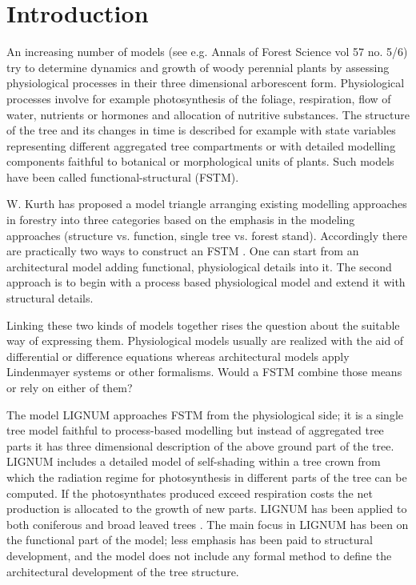 \section{Introduction}
An increasing number of models  (see e.g. Annals of Forest Science vol
57 no.  5/6) try to determine  dynamics and growth  of woody perennial
plants by assessing physiological processes in their three dimensional
arborescent  form.    Physiological  processes  involve   for  example
photosynthesis of  the foliage, respiration, flow  of water, nutrients
or hormones and allocation  of nutritive substances.  The structure of
the tree and  its changes in time is described  for example with state
variables representing different  aggregated tree compartments or with
detailed modelling  components faithful to  botanical or morphological
units of  plants. Such  models have been  called functional-structural
(FSTM).

W.  Kurth has  proposed a  model triangle  \citep{kurth:94b} arranging
existing modelling approaches in  forestry into three categories based
on the  emphasis in the modeling approaches  (structure vs.  function,
single tree vs. forest  stand).  Accordingly there are practically two
ways to construct an FSTM  \citep{sievanen:00}.  One can start from an
architectural  model   \citep{jaeger:92,kurth:94}  adding  functional,
physiological details into it.  The second approach is to begin with a
process  based  physiological  model  \citep{makela:86,  landsberg:86,
sievanen:93} and extend it with structural details.

Linking these  two kinds of  models together rises the  question about
the suitable way of  expressing them. Physiological models usually are
realized with the aid of differential or difference equations
\citep{landsberg:86} whereas architectural models apply Lindenmayer
systems \citep{kurth:99,pp:90} or other formalisms. Would a FSTM
combine those means or rely on either of them?

The model LIGNUM  approaches FSTM from the physiological  side; it is a
single  tree  model  \citep{perttunen:96}  faithful  to  process-based
modelling  \citep[see  e.g.][]{nikinmaa:92, sievanen:93,  makela:97-1}
but  instead  of  aggregated  tree  parts  it  has  three  dimensional
description of the  above ground part of the  tree.  LIGNUM includes a
detailed    model    of    self-shading    within   a    tree    crown
\citep{perttunen:96, perttunen:01} from which the radiation regime for
photosynthesis in different parts of the tree can be computed.  If the
photosynthates produced exceed respiration costs the net production is
allocated to the growth of new  parts. LIGNUM has been applied to both
coniferous   \citep{perttunen:96,lo:99}   and   broad   leaved   trees
\citep{perttunen:01}. The main focus in LIGNUM has been on the
functional  part  of  the  model;  less  emphasis  has  been  paid  to
structural  development, and  the model  does not  include  any formal
method to define the architectural development of the tree structure.

